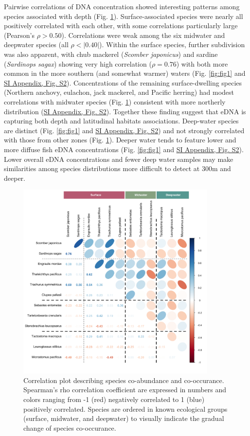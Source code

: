 \documentclass{article}
\begin{document}
Pairwise correlations of DNA concentration showed interesting patterns among species associated with depth (Fig. \ref{fig:fig2}). Surface-associated species were nearly all positively correlated with each other, with some correlations particularly large (Pearson's $\rho > 0.50$). Correlations were weak among the six midwater and deepwater species (all $\rho < |0.40|$). Within the surface species, further subdivision was also apparent, with chub mackerel (\textit{Scomber japonicus}) and sardine (\textit{Sardinops sagax}) showing very high correlation ($\rho = 0.76$) with both more common in the more southern (and somewhat warmer) waters (Fig. \ref{fig:fig1} and \href{SI_Appendix.pdf}{SI Appendix, Fig. S2}). Concentrations of the remaining surface-dwelling species (Northern anchovy, eulachon, jack mackerel, and Pacific herring) had modest correlations with midwater species (Fig. \ref{fig:fig2}) consistent with more northerly distribution (\href{SI_Appendix.pdf}{SI Appendix, Fig. S2}). Together these finding suggest that eDNA is capturing both depth and latitudinal habitats associations. Deep-water species are distinct (Fig. \ref{fig:fig1} and \href{SI_Appendix.pdf}{SI Appendix, Fig. S2}) and not strongly correlated with those from other zones (Fig. \ref{fig:fig2}). Deeper water tends to feature lower and more diffuse fish eDNA concentrations (Fig. \ref{fig:fig1} and \href{SI_Appendix.pdf}{SI Appendix, Fig. S2}). Lower overall eDNA concentrations and fewer deep water samples may make similarities among species distributions more difficult to detect at 300m and deeper.

\begin{figure}[tbhp] 
\centering
\includegraphics[width=10cm]{plots/2_Figure_2.jpg}  
\caption{Correlation plot describing species co-abundance and co-occurance. Spearman’s rho correlation coefficient are expressed in numbers and colors ranging from -1 (red) negatively correlated to 1 (blue) positively correlated. Species are ordered in known ecological groups (surface, midwater, and deepwater) to visually indicate the gradual change of species co-occurance.}
\label{fig:fig2}
\end{figure}
\end{document}
